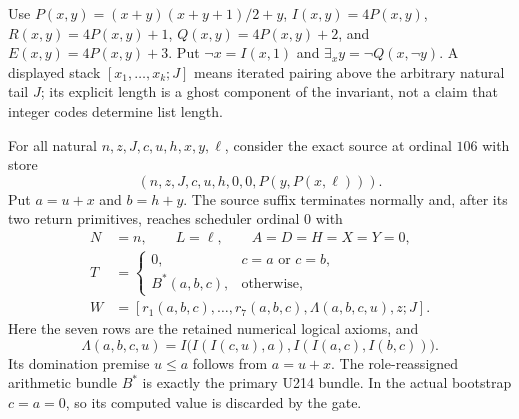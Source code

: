 Use $P(x,y)=(x+y)(x+y+1)/2+y$, $I(x,y)=4P(x,y)$,
$R(x,y)=4P(x,y)+1$, $Q(x,y)=4P(x,y)+2$, and
$E(x,y)=4P(x,y)+3$.  Put $\neg x=I(x,1)$ and
$\exists_x y=\neg Q(x,\neg y)$.  A displayed stack
$[x_1,\ldots,x_k;J]$ means iterated pairing above the arbitrary
natural tail $J$; its explicit length is a ghost component of the
invariant, not a claim that integer codes determine list length.

For all natural $n,z,J,c,u,h,x,y,\ell$, consider the exact source at
ordinal $106$ with store
\[
 (n,z,J,c,u,h,0,0,P(y,P(x,\ell))).
\]
Put $a=u+x$ and $b=h+y$.  The source suffix terminates normally and,
after its two return primitives, reaches scheduler ordinal $0$ with
\begin{equation}
 \begin{split}
 N&=n,\qquad L=\ell,\qquad A=D=H=X=Y=0,\\
 T&=\begin{cases}0,&c=a\text{ or }c=b,\\B^*(a,b,c),&\text{otherwise},\end{cases}\\
 W&=[r_1(a,b,c),\ldots,r_7(a,b,c),
        \Lambda(a,b,c,u),z;J].
 \end{split}
 \label{eq:u213-suffix-contract}
\end{equation}
Here the seven rows are the retained numerical logical axioms, and
\[
 \Lambda(a,b,c,u)=
 I\bigl(I(I(c,u),a),I(I(a,c),I(b,c))\bigr).
\]
Its domination premise $u\leq a$ follows from $a=u+x$.
The role-reassigned arithmetic bundle $B^*$ is exactly the primary
U214 bundle.  In the actual bootstrap $c=a=0$, so its computed value
is discarded by the gate.

